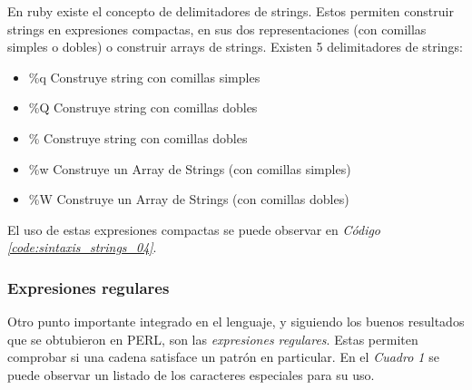 \documentclass{article}
\newcommand{\refcode}[1]{\textit{Código \ref{#1}}}
\begin{document}
	En ruby existe el concepto de delimitadores de strings. Estos permiten construir strings en expresiones compactas, en sus dos representaciones (con comillas simples o dobles) o construir arrays de strings. Existen 5 delimitadores de strings:

\begin{itemize}
	\itemsep=1pt \topsep=0pt \partopsep=0pt \parskip=0pt \parsep=0pt
	\item  \%q	Construye string con comillas simples
	\item  \%Q	Construye string con comillas dobles
	\item  \%        Construye string con comillas dobles
	\item \%w	Construye un Array de Strings (con comillas simples)
	\item  \%W     Construye un Array de Strings (con comillas dobles)
\end{itemize}
	
	El uso de estas expresiones compactas se puede observar en \refcode{code:sintaxis_strings_04}.

 
\bigskip


\subsubsection{Expresiones regulares}
Otro punto importante integrado en el lenguaje, y siguiendo los buenos resultados que se obtubieron en PERL, son las \textit{expresiones regulares}. Estas permiten comprobar si una cadena satisface un patrón en particular. En el \textit{Cuadro 1} se puede observar un listado de los caracteres especiales para su uso.\\
\end{document}
